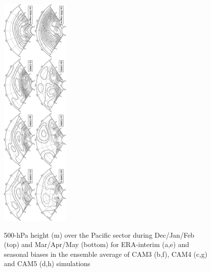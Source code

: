 \documentclass[12pt,varwidth]{article}
\begin{document}
\begin{figure}[t]
  \begin{center}
    \noindent\includegraphics[width=0.3\textwidth,angle=90.]{./figs/f_mean_Z500_pac.pdf}\\
  \end{center}
  \caption{500-hPa height (m) over the Pacific sector during Dec/Jan/Feb (top) and Mar/Apr/May (bottom) for ERA-interim (a,e) and seasonal biases in the ensemble average of CAM3 (b,f), CAM4 (c,g) and CAM5 (d,h) simulations}
\label{f_mean_Z500_pac}
\end{figure}
\end{document}
